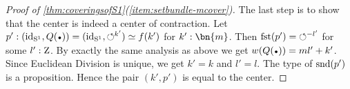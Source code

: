 \begin{proof}[Proof of \cref{thm:coveringsofS1}(\ref{item:setbundle-mcover})]
The last step is to show that the center is indeed a center of contraction.
Let $p': (\id_\Sc,Q(\base))=(\id_\Sc,{\Sloop}^{k'})\jdeq f(k')$ for $k':\bn{m}$.
Then $\fst(p') = {\Sloop}^{-l'}$ for some $l':\mathrm{Z}$. By exactly
the same analysis as above we get $w(Q(\base)) = ml'+k'$. Since Euclidean Division
is unique, we get $k'=k$ and $l'=l$. The type of $\snd(p')$ is a proposition.
Hence the pair $(k',p')$ is equal to the center. 
\end{proof}

